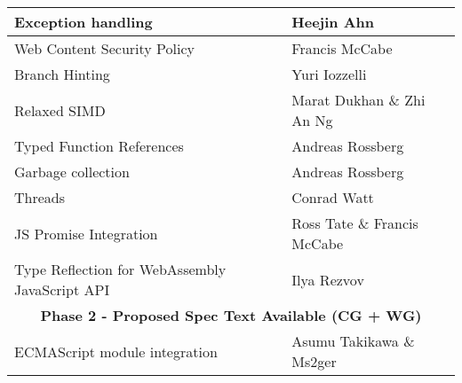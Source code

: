 \begin{table}[htbp]
\begin{tabular}{|ll|}
    \multicolumn{1}{|l|}{Exception handling}                             & Heejin Ahn                                                                                                                      \\ \hline
    \multicolumn{1}{|l|}{Web Content Security Policy}                    & Francis McCabe                                                                                                                  \\ \hline
    \multicolumn{1}{|l|}{Branch Hinting}                                 & Yuri Iozzelli                                                                                                                   \\ \hline
    \multicolumn{1}{|l|}{Relaxed SIMD}                                   & Marat Dukhan \& Zhi An Ng                                                                                                       \\ \hline
    \multicolumn{1}{|l|}{Typed Function References}                      & Andreas Rossberg                                                                                                                \\ \hline
    \multicolumn{1}{|l|}{Garbage collection}                             & Andreas Rossberg                                                                                                                \\ \hline
    \multicolumn{1}{|l|}{Threads}                                        & Conrad Watt                                                                                                                     \\ \hline
    \multicolumn{1}{|l|}{JS Promise Integration}                         & Ross Tate \& Francis McCabe                                                                                                    \\ \hline
    \multicolumn{1}{|l|}{Type Reflection for WebAssembly JavaScript API} & Ilya Rezvov                                                                                                                     \\ \hline
    \multicolumn{2}{|c|}{\textbf{Phase 2 - Proposed Spec Text Available (CG + WG)}}                                                                                                                        \\ \hline
    \multicolumn{1}{|l|}{ECMAScript module integration}                  & Asumu Takikawa \& Ms2ger                                                                                                        \\ \hline

\end{tabular}
\end{table}
